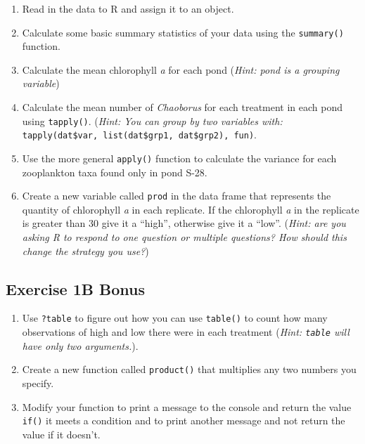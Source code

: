 \documentclass[]{book}
\providecommand{\tightlist}{%
  \setlength{\itemsep}{0pt}\setlength{\parskip}{0pt}}
\theoremstyle{definition}
\theoremstyle{definition}
\theoremstyle{definition}
\theoremstyle{remark}
\begin{document}
\begin{enumerate}
\def\labelenumi{\arabic{enumi}.}
\tightlist
\item
  Read in the data to R and assign it to an object.
\item
  Calculate some basic summary statistics of your data using the
  \texttt{summary()} function.
\item
  Calculate the mean chlorophyll \emph{a} for each pond (\emph{Hint:
  pond is a grouping variable})
\item
  Calculate the mean number of \emph{Chaoborus} for each treatment in
  each pond using \texttt{tapply()}. (\emph{Hint: You can group by two
  variables with:}
  \texttt{tapply(dat\$var,\ list(dat\$grp1,\ dat\$grp2),\ fun)}.
\item
  Use the more general \texttt{apply()} function to calculate the
  variance for each zooplankton taxa found only in pond S-28.
\item
  Create a new variable called \texttt{prod} in the data frame that
  represents the quantity of chlorophyll \emph{a} in each replicate. If
  the chlorophyll \emph{a} in the replicate is greater than 30 give it a
  ``high'', otherwise give it a ``low''. (\emph{Hint: are you asking R
  to respond to one question or multiple questions? How should this
  change the strategy you use?})
\end{enumerate}

\subsection*{Exercise 1B Bonus}\label{exercise-1b-bonus}

\begin{enumerate}
\def\labelenumi{\arabic{enumi}.}
\tightlist
\item
  Use \texttt{?table} to figure out how you can use \texttt{table()} to
  count how many observations of high and low there were in each
  treatment (\emph{Hint: \texttt{table} will have only two arguments.}).
\item
  Create a new function called \texttt{product()} that multiplies any
  two numbers you specify.
\item
  Modify your function to print a message to the console and return the
  value \texttt{if()} it meets a condition and to print another message
  and not return the value if it doesn't.
\end{enumerate}
\end{document}
